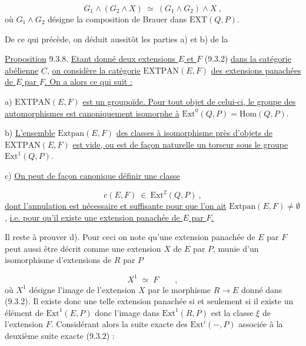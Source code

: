 \begin{equation}\tag{9.3.7}
G_1 \wedge (G_2 \wedge X) \ \simeq \ (G_1 \wedge G_2) \wedge X \ ,
\end{equation}
où $G_1 \wedge G_2$ désigne la composition de Brauer dans $\mathrm{EXT}(Q,P)$.

De ce qui précède, on déduit aussitôt les parties a) et b) de la

\underline{Proposition} 9.3.8. \underline{Etant donné deux extensions $E$ et $F$} (9.3.2) \underline{dans la catégorie abélienne} $\underline{C}$, \underline{on considère la catégorie} $\mathrm{EXTPAN}(E,F)$ \underline{des extensions panachées de $E$ par $F$. On a alors ce qui suit :}

a) $\mathrm{EXTPAN}(E,F)$ \underline{est un groupoïde. Pour tout objet de celui-ci, le groupe des automorphismes est canoniquement isomorphe à} $\mathrm{Ext}^{0}(Q,P) = \mathrm{Hom}(Q,P)$.

b) \underline{L'ensemble} $\mathrm{Extpan}(E,F)$ \underline{des classes à isomorphisme près d'objets de} $\mathrm{EXTPAN}(E,F)$ \underline{est vide, ou est de façon naturelle un torseur sous le groupe} $\mathrm{Ext}^{1}(Q,P)$.

c) \underline{On peut de façon canonique définir une classe}

\begin{equation}\tag{9.3.9}
c(E,F) \ \in \ \mathrm{Ext}^{2}(Q,P) \ ,
\end{equation}
\underline{dont l'annulation est nécessaire et suffisante pour que l'on ait} $\mathrm{Extpan}(E,F) \neq \emptyset$ , \underline{i.e. pour qu'il existe une extension panachée de $E$ par $F$.}



Il reste à prouver d). Pour ceci on note qu'une extension panachée de $E$ par $F$ peut aussi être décrit comme une extension $X$ de $E$ par $P$, munie d'un isomorphisme d'extensions de $R$ par $P$

\begin{equation*}
X^1 \;\simeq\; F \qquad ,
\end{equation*}
où $X^1$ désigne l'image de l'extension $X$ par le morphisme $R \longrightarrow E$ donné dans (9.3.2). Il existe donc une telle extension panachée si et seulement si il existe un élément de $\mathrm{Ext}^1(E,P)$ donc l'image dans $\mathrm{Ext}^1(R,P)$ est la classe $\xi$ de l'extension $F$. Considérant alors la suite exacte des $\mathrm{Ext}^i( - ,P)$ associée à la deuxième suite exacte (9.3.2) :

